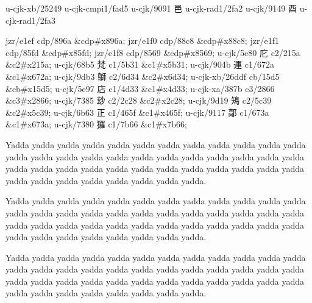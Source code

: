 \begin{multicols}{2}
u-cjk-xb/25249	{	}u-cjk-cmpi1/fad5	{} 
u-cjk/9091	{\cjk{}邑}	u-cjk-rad1/2fa2	{} 
u-cjk/9149	{\cjk{}酉}	u-cjk-rad1/2fa3	{} 
\endgroup{}\mktsShowpar\par
\begingroup\mktsStyleCode{}\begingroup\mktsObeyAllLines{}jzr/e1ef	{	}cdp/896a	\&cdp\#x896a; 
jzr/e1f0	{	}cdp/88c8	\&cdp\#x88c8; 
jzr/e1f1	{	}cdp/85fd	\&cdp\#x85fd; 
jzr/e1f8	{	}cdp/8569	\&cdp\#x8569; 
u-cjk/5e80	{\cjk{}庀}	c2/215a	\&c2\#x215a;
u-cjk/68b5	{\cjk{}梵}	c1/5b31	\&c1\#x5b31;
u-cjk/904b	{\cjk{}運}	c1/672a	\&c1\#x672a;
u-cjk/9db3	{\cjk{}鶳}	c2/6d34	\&c2\#x6d34;
u-cjk-xb/26ddf	{	}cb/15d5	\&cb\#x15d5;
u-cjk/5e97	{\cjk{}店}	c1/4d33	\&c1\#x4d33;
u-cjk-xa/387b	{	}c3/2866	\&c3\#x2866;
u-cjk/7385	{\cjk{}玅}	c2/2c28	\&c2\#x2c28;
u-cjk/9d19	{\cjk{}鴙}	c2/5c39	\&c2\#x5c39;
u-cjk/6b63	{\cjk{}正}	c1/465f	\&c1\#x465f;
u-cjk/9117	{\cjk{}鄗}	c1/673a	\&c1\#x673a;
u-cjk/7380	{\cjk{}玀}	c1/7b66	\&c1\#x7b66;

\endgroup{}\endgroup{}Yadda yadda yadda yadda yadda yadda yadda yadda yadda yadda yadda
yadda yadda yadda yadda yadda yadda yadda yadda yadda yadda yadda
yadda yadda yadda yadda yadda yadda yadda yadda yadda yadda yadda
yadda yadda yadda yadda yadda yadda yadda yadda yadda yadda yadda.\mktsShowpar\par
Yadda yadda yadda yadda yadda yadda yadda yadda yadda yadda yadda
yadda yadda yadda yadda yadda yadda yadda yadda yadda yadda yadda
yadda yadda yadda yadda yadda yadda yadda yadda yadda yadda yadda
yadda yadda yadda yadda yadda yadda yadda yadda yadda yadda yadda.\mktsShowpar\par
Yadda yadda yadda yadda yadda yadda yadda yadda yadda yadda yadda
yadda yadda yadda yadda yadda yadda yadda yadda yadda yadda yadda
yadda yadda yadda yadda yadda yadda yadda yadda yadda yadda yadda
yadda yadda yadda yadda yadda yadda yadda yadda yadda yadda yadda.\mktsShowpar\par
\end{multicols}
